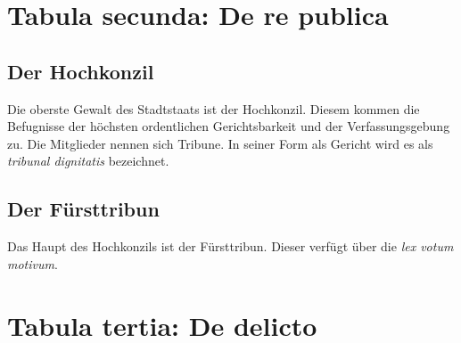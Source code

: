 \documentclass{article}
\begin{document}
\section{Tabula secunda: De re publica}
\subsection{Der Hochkonzil}
Die oberste Gewalt des Stadtstaats ist der Hochkonzil. Diesem kommen die Befugnisse der höchsten ordentlichen Gerichtsbarkeit und der Verfassungsgebung zu. Die Mitglieder nennen sich Tribune. In seiner Form als Gericht wird es als \textit{tribunal dignitatis} bezeichnet.

\subsection{Der Fürsttribun}
Das Haupt des Hochkonzils ist der Fürsttribun. Dieser verfügt über die \textit{lex votum motivum}.

\section{Tabula tertia: De delicto}
\end{document}
